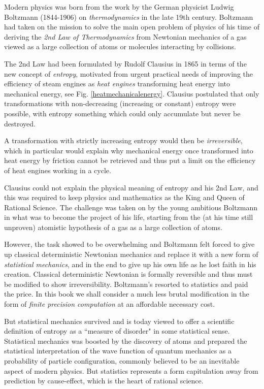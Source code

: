 Modern physics was born from the work by the German physicist Ludwig Boltzmann (1844-1906) on \emph{thermodynamics} in the late 19th century. Boltzmann had taken on the mission to solve the main open problem of physics of his time of deriving the \emph{2nd Law of Thermodynamics} from Newtonian mechanics of a gas viewed as a large collection of atoms or molecules interacting by collisions. 

The 2nd Law had been formulated by Rudolf Clausius in 1865 in terms of the new concept of \emph{entropy},  motivated from urgent practical needs of improving the efficiency of steam engines as \emph{heat engines} transforming heat energy into mechanical energy, see Fig. \ref{heatmechanicalenergy}. Clausius postulated that only transformations with non-decreasing (increasing or constant) entropy were possible, with entropy something which could only accumulate but never be destroyed. 

A transformation with strictly increasing entropy would then be \emph{irreversible}, which in particular would explain why  mechanical energy once transformed into heat energy by friction cannot be retrieved and thus put a limit on the efficiency of heat engines working in a cycle. 

Clausius could not explain the physical meaning of entropy and his 2nd Law, and this was required to keep physics and mathematics as the King and Queen of Rational Science. The challenge was taken on by the young ambitious Boltzmann in what was to become the project of his life, starting from the (at his time still unproven) atomistic hypothesis of a gas as a large collection of atoms. 

However, the task showed to be overwhelming and Boltzmann felt forced to give up classical deterministic Newtonian mechanics and replace it with a new form of \emph{statistical mechanics},  and in the end to give up his own life as he lost faith in his creation.  Classical deterministic Newtonian is formally reversible and thus must be modified to show irreversibility.
Boltzmann's resorted to statistics and paid the price. In this book we shall consider a much less brutal modification
in the form of \emph{finite precision computation} at an affordable necessary cost.  

But statistical mechanics survived and is today viewed to offer a scientific definition of entropy as
 a ``measure of disorder" in some statistical sense. Statistical mechanics was boosted by the discovery of atoms and 
prepared the statistical interpretation of the wave function of quantum mechanics as a probability of particle configuration, commonly believed to be an inevitable aspect of modern physics. But statistics represents a form capitulation away from prediction by cause-effect, which is the heart of rational science. 

